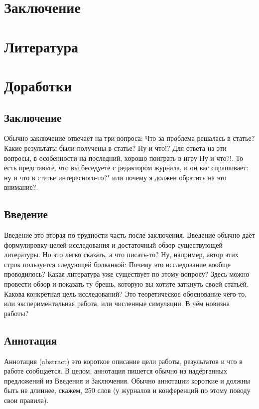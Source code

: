 \documentclass[10pt,aps,pra]{revtex4-1}
\begin{document}
\section{Заключение}




\section{Литература}


 

\section{Доработки}

\subsection{Заключение}
Обычно заключение отвечает на три вопроса:
Что за проблема решалась в статье?
Какие результаты были получены в статье?
Ну и что!?
Для ответа на эти вопросы, в особенности на последний, хорошо поиграть в игру Ну и что?!. То есть представьте, что вы беседуете с редактором журнала, и он вас спрашивает: ну и что в статье интересного-то?" или почему я должен обратить на это внимание?.

\subsection{Введение}
Введение это вторая по трудности часть после заключения. Введение обычно даёт формулировку целей исследования и достаточный обзор существующей литературы. Но это легко сказать, а что писать-то? Ну, например, автор этих строк пользуется следующей болванкой:
Почему это исследование вообще проводилось?
Какая литература уже существует по этому вопросу? Здесь можно провести обзор и показать ту брешь, которую вы хотите заткнуть своей статьёй.
Какова конкретная цель исследований? Это теоретическое обоснование чего-то, или экспериментальная работа, или численные симуляции.
В чём новизна работы?

\subsection{Аннотация}
Аннотация (abstract) это короткое описание цели работы, результатов и что в работе сообщается. В целом, аннотация пишется обычно из надёрганных предложений из Введения и Заключения. Обычно аннотации короткие и должны быть не длиннее, скажем, 250 слов (у журналов и конференций по этому поводу свои правила).
\end{document}
